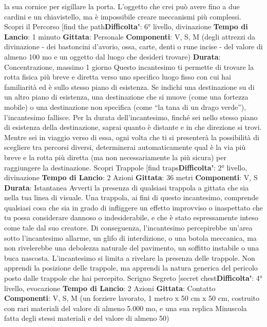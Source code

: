 \begin{multicols}{2}
la sua cornice per sigillare la porta. L’oggetto che crei
può avere fino a due cardini e un chiavistello, ma è
impossibile creare meccanismi più complessi.
Scopri il Percorso
[find the path\textbf{Difficolta'}:
6° livello, divinazione
\textbf{Tempo di Lancio}: 1 minuto
\textbf{Gittata}: Personale
\textbf{Componenti}: V, S, M (degli attrezzi da divinazione -
dei bastoncini d’avorio, ossa, carte, denti o rune incise -
del valore di almeno 100 mo e un oggetto dal luogo che
desideri trovare)
\textbf{Durata}: Concentrazione, massimo 1 giorno
Questo incantesimo ti permette di trovare la rotta fisica
più breve e diretta verso uno specifico luogo fisso con
cui hai familiarità ed è sullo stesso piano di esistenza.
Se indichi una destinazione su di un altro piano di
esistenza, una destinazione che si muove (come una 
fortezza mobile) o una destinazione non specifica
(come “la tana di un drago verde”), l’incantesimo
fallisce.
Per la durata dell’incantesimo, finché sei nello stesso
piano di esistenza della destinazione, saprai quanto è
distante e in che direzione si trovi. Mentre sei in viaggio
verso di essa, ogni volta che ti si presenterà la
possibilità di scegliere tra percorsi diversi, determinerai
automaticamente qual è la via più breve e la rotta più
diretta (ma non necessariamente la più sicura) per
raggiungere la destinazione.
Scopri Trappole
[find traps\textbf{Difficolta'}:
2° livello, divinazione
\textbf{Tempo di Lancio}: 2 Azioni
\textbf{Gittata}: 36 metri
\textbf{Componenti}: V, S
\textbf{Durata}: Istantanea
Avverti la presenza di qualsiasi trappola a gittata che
sia nella tua linea di visuale. Una trappola, ai fini di
questo incantesimo, comprende qualsiasi cosa che sia
in grado di infliggere un effetto improvviso o inaspettato
che tu possa considerare dannoso o indesiderabile, e
che è stato espressamente inteso come tale dal suo
creatore. Di conseguenza, l’incantesimo percepirebbe
un’area sotto l’incantesimo allarme, un glifo di
interdizione, o una botola meccanica, ma non
rivelerebbe una debolezza naturale del pavimento, un
soffitto instabile o una buca nascosta.
L’incantesimo si limita a rivelare la presenza delle
trappole. Non apprendi la posizione delle trappole, ma
apprendi la natura generica del pericolo posto dalle
trappole che hai percepito.
Scrigno Segreto
[secret chest\textbf{Difficolta'}:
4° livello, evocazione
\textbf{Tempo di Lancio}: 2 Azioni
\textbf{Gittata}: Contatto
\textbf{Componenti}: V, S, M (un forziere lavorato, 1 metro x
50 cm x 50 cm, costruito con rari materiali del valore di
almeno 5.000 mo, e una sua replica Minuscola fatta
degli stessi materiali e del valore di almeno 50)

\end{multicols}
